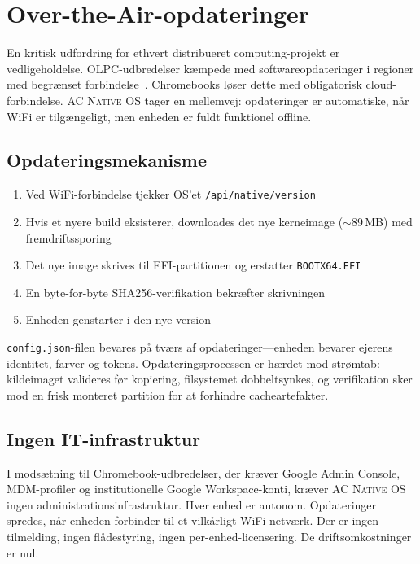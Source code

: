 \documentclass[10pt,letterpaper,twocolumn]{article}
\newcommand{\acos}{\textsc{AC Native OS}}
\begin{document}
\section{Over-the-Air-opdateringer}
\label{sec:ota}

En kritisk udfordring for ethvert distribueret computing-projekt er vedligeholdelse. OLPC-udbredelser kæmpede med softwareopdateringer i regioner med begrænset forbindelse~\citep{warschauer2004technology}. Chromebooks løser dette med obligatorisk cloud-forbindelse. \acos{} tager en mellemvej: opdateringer er automatiske, når WiFi er tilgængeligt, men enheden er fuldt funktionel offline.

\subsection{Opdateringsmekanisme}

\begin{enumerate}
  \item Ved WiFi-forbindelse tjekker OS'et \texttt{/api/native/version}
  \item Hvis et nyere build eksisterer, downloades det nye kerneimage ($\sim$89\,MB) med fremdriftssporing
  \item Det nye image skrives til EFI-partitionen og erstatter \texttt{BOOTX64.EFI}
  \item En byte-for-byte SHA256-verifikation bekræfter skrivningen
  \item Enheden genstarter i den nye version
\end{enumerate}

\texttt{config.json}-filen bevares på tværs af opdateringer---enheden bevarer ejerens identitet, farver og tokens. Opdateringsprocessen er hærdet mod strømtab: kildeimaget valideres før kopiering, filsystemet dobbeltsynkes, og verifikation sker mod en frisk monteret partition for at forhindre cacheartefakter.

\subsection{Ingen IT-infrastruktur}

I modsætning til Chromebook-udbredelser, der kræver Google Admin Console, MDM-profiler og institutionelle Google Workspace-konti, kræver \acos{} ingen administrationsinfrastruktur. Hver enhed er autonom. Opdateringer spredes, når enheden forbinder til et vilkårligt WiFi-netværk. Der er ingen tilmelding, ingen flådestyring, ingen per-enhed-licensering. De driftsomkostninger er nul.
\end{document}
